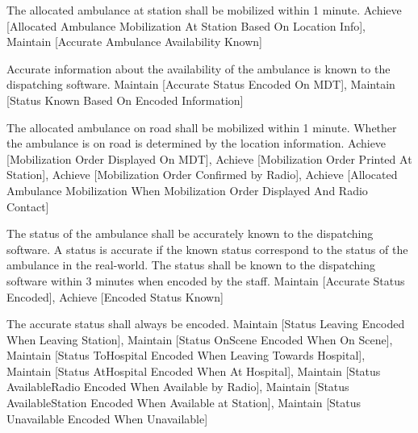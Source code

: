   \startkaosspec
  	 {The allocated ambulance at station shall be mobilized within 1 minute.}
  	 {Achieve [Allocated Ambulance Mobilization At Station Based On Location Info], Maintain [Accurate Ambulance Availability Known]}
  \stopkaosspec
  
  
    {}

  \startkaosspec
  	 {Accurate information about the availability of the ambulance is known to the dispatching software.}
  	 {Maintain [Accurate Status Encoded On MDT], Maintain [Status Known Based On Encoded Information]}
  \stopkaosspec

  \startkaosspec
  	 {The allocated ambulance on road shall be mobilized within 1 minute. Whether the ambulance is on road is determined by the location information.}
  	 {Achieve [Mobilization Order Displayed On MDT], Achieve [Mobilization Order Printed At Station], Achieve [Mobilization Order Confirmed by Radio], Achieve [Allocated Ambulance Mobilization When Mobilization Order Displayed And Radio Contact]}
  \stopkaosspec
  
  
    {}
    
  \startkaosspec
  	 {The status of the ambulance shall be accurately known to the dispatching software. A status is accurate if the known status correspond to the status of the ambulance in the real-world. The status shall be known to the dispatching software within 3 minutes when encoded by the staff.}
  	 {Maintain [Accurate Status Encoded], Achieve [Encoded Status Known]}
  \stopkaosspec

  \startkaosspec
  	 {The accurate status shall always be encoded.}
  	 {Maintain [Status Leaving Encoded When Leaving Station], Maintain [Status OnScene Encoded When On Scene], Maintain [Status ToHospital Encoded When Leaving Towards Hospital], Maintain [Status AtHospital Encoded When At Hospital], Maintain [Status AvailableRadio Encoded When Available by Radio], Maintain [Status AvailableStation Encoded When Available at Station], Maintain [Status Unavailable Encoded When Unavailable]}
  \stopkaosspec
  
